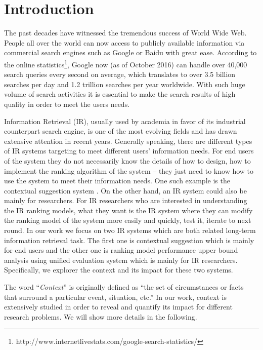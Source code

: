 %
%
\chapter{Introduction}
The past decades have witnessed the tremendous success of World Wide Web. 
People all over the world can now access to publicly available 
information via commercial search engines such as Google or Baidu 
with great ease. According to the online 
statistics\footnote{http://www.internetlivestats.com/google-search-statistics/}, 
Google now (as of October 2016) can handle over 40,000 search queries 
every second on average, which translates to over 3.5 billion searches 
per day and 1.2 trillion searches per year worldwide. 
With such huge volume of search activities it is essential to make the 
search results of high quality in order to meet the users needs.

Information Retrieval (IR), usually used by academia in favor of its 
industrial counterpart search engine, is one of the most evolving fields 
and has drawn extensive attention in recent years.
Generally speaking, there are different types of IR systems targeting to meet 
different users' information needs. 
For end users of the system they do not necessarily know the details of 
how to design, how to implement the ranking algorithm of the system -- 
they just need to know how to use the system to meet their information needs. 
One such example is the contextual suggestion system 
\cite{udel:treccs2013, udel:treccs2014, udel:treccs2015, 
Yang:2013:OUP:2499178.2499191, Yang2015}.
On the other hand, an IR system could also be mainly for researchers. 
For IR researchers who are interested in understanding the IR ranking models, 
what they want is the IR system where they can modify the ranking model of 
the system more easily and quickly, test it, iterate to next round.
In our work we focus on two IR systems which are both related long-term 
information retrieval task. The first one is contextual suggestion which is 
mainly for end users and the other one is ranking model performance upper 
bound analysis using unified evaluation system which is mainly for IR 
researchers. Specifically, we explorer the context and its impact for these 
two systems.

The word ``\textit{Context}'' is originally defined as 
``the set of circumstances or facts that surround a particular event, situation, etc.''
In our work, context is extensively studied in order to reveal and quantify 
its impact for different research problems. We will show more details 
in the following.

